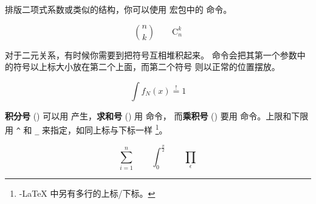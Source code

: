 
排版二项式系数或类似的结构，你可以使用  宏包中的  命令。
\begin{example}
\begin{displaymath}
\binom{n}{k}\qquad\mathrm{C}_n^k
\end{displaymath}
\end{example}


对于二元关系，有时候你需要到把符号互相堆积起来。  命令会把其第一个参数中的符号以上标大小放在第二个上面，而第二个符号
则以正常的位置摆放。

\begin{example}
\begin{displaymath}
\int f_N(x) \stackrel{!}{=} 1
\end{displaymath}
\end{example}


\textbf{积分号} () 可以用  产生，\textbf{求和号} () 用  命令， 而\textbf{乘积号} () 要用  命令。上限和下限用 \verb|^| 和 \verb|_| 来指定，如同上标与下标一样
\footnote{\AmS-\LaTeX{} 中另有多行的上标/下标。}。


\begin{example}
\begin{displaymath}
\sum_{i=1}^{n} \qquad
\int_{0}^{\frac{\pi}{2}} \qquad
\prod_\epsilon
\end{displaymath}
\end{example}


